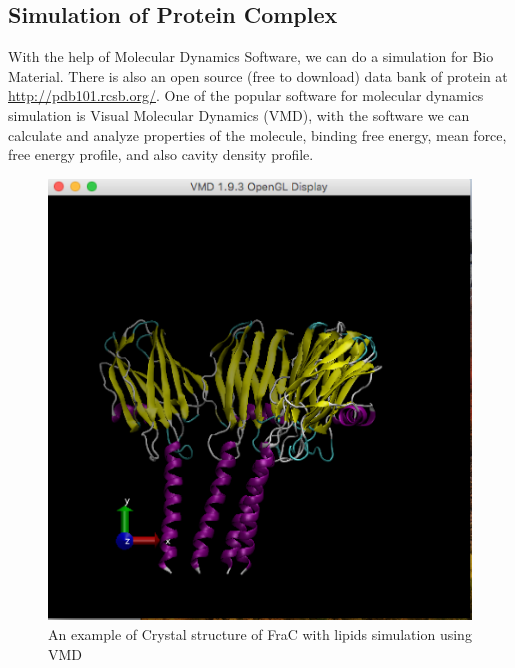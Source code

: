 \documentclass[a4paper,11pt]{article}
\begin{document}
\subsection{Simulation of Protein Complex}
With the help of Molecular Dynamics Software, we can do a simulation for Bio Material. There is also an open source (free to download) data bank of protein at \url{http://pdb101.rcsb.org/}. One of the popular software for molecular dynamics simulation is Visual Molecular Dynamics (VMD), with the software we can calculate and analyze properties of the molecule, binding free energy, mean force, free energy profile, and also cavity density profile.
\begin{figure}[h!]
	\centering
	\includegraphics[width=0.37\linewidth]{picture/lipidfrac}
	\caption{An example of Crystal structure of FraC with lipids simulation using VMD}
	\label{fig:example1}
\end{figure}
\end{document}
